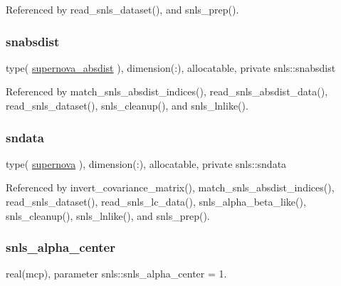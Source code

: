 Referenced by read\+\_\+snls\+\_\+dataset(), and snls\+\_\+prep().

\mbox{\label{namespacesnls_aa9cb8d9344c2bfe3a01327e48ae3aaf1}} 
\subsubsection{\texorpdfstring{snabsdist}{snabsdist}}
{\footnotesize\ttfamily type( \mbox{\hyperlink{structsnls_1_1supernova__absdist}{supernova\+\_\+absdist}} ), dimension(\+:), allocatable, private snls\+::snabsdist\hspace{0.3cm}{\ttfamily [private]}}



Referenced by match\+\_\+snls\+\_\+absdist\+\_\+indices(), read\+\_\+snls\+\_\+absdist\+\_\+data(), read\+\_\+snls\+\_\+dataset(), snls\+\_\+cleanup(), and snls\+\_\+lnlike().

\mbox{\label{namespacesnls_ad60f7a857849e3df34947a9a90a53f38}} 
\subsubsection{\texorpdfstring{sndata}{sndata}}
{\footnotesize\ttfamily type( \mbox{\hyperlink{structsnls_1_1supernova}{supernova}} ), dimension(\+:), allocatable, private snls\+::sndata\hspace{0.3cm}{\ttfamily [private]}}



Referenced by invert\+\_\+covariance\+\_\+matrix(), match\+\_\+snls\+\_\+absdist\+\_\+indices(), read\+\_\+snls\+\_\+dataset(), read\+\_\+snls\+\_\+lc\+\_\+data(), snls\+\_\+alpha\+\_\+beta\+\_\+like(), snls\+\_\+cleanup(), snls\+\_\+lnlike(), and snls\+\_\+prep().

\mbox{\label{namespacesnls_a153b2cafcd96b5cf2ea20c31595180a0}} 
\subsubsection{\texorpdfstring{snls\+\_\+alpha\+\_\+center}{snls\_alpha\_center}}
{\footnotesize\ttfamily real(mcp), parameter snls\+::snls\+\_\+alpha\+\_\+center = 1.\hspace{0.3cm}{\ttfamily [private]}}



